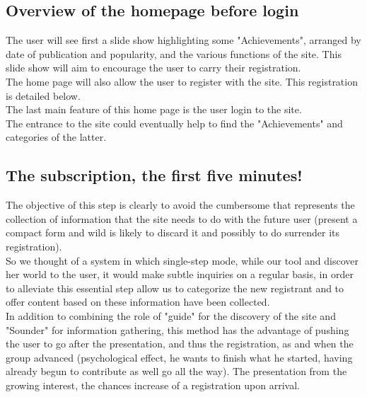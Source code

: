 \documentclass{life-fr}
\begin{document}
\subsection{Overview of the homepage before login}

The user will see first a slide show highlighting some "Achievements", arranged by date of publication and popularity, and the various functions of the site. This slide show will aim to encourage the user to carry their registration.\\

The home page will also allow the user to register with the site. This registration is detailed below.\\

The last main feature of this home page is the user login to the site.\\

The entrance to the site could eventually help to find the "Achievements" and categories of the latter.

\newpage

\subsection{The subscription, the first five minutes!}

The objective of this step is clearly to avoid the cumbersome that represents the collection of information that the site needs to do with the future user (present a compact form and wild is likely to discard it and possibly to do surrender its registration).\\

So we thought of a system in which single-step mode, while our tool and discover her world to the user, it would make subtle inquiries on a regular basis, in order to alleviate this essential step allow us to categorize the new registrant and to offer content based on these information have been collected.\\

In addition to combining the role of "guide" for the discovery of the site and "Sounder" for information gathering, this method has the advantage of pushing the user to go after the presentation, and thus the registration, as and when the group advanced (psychological effect, he wants to finish what he started, having already begun to contribute as well go all the way). The presentation from the growing interest, the chances increase of a registration upon arrival.\\
\\
\end{document}
